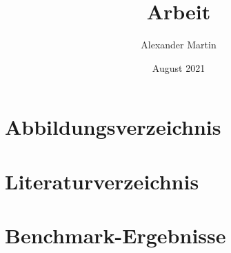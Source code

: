 \documentclass[11pt,titlepage]{book}
\title{Arbeit}
\author{Alexander Martin}
\date{August 2021}
\newcommand\blankpage{
    \null
    \thispagestyle{empty}
    \addtocounter{page}{-1}
    \newpage
}
\begin{document}
\let\origdoublepage\cleardoublepage
\newcommand{\clearemptydoublepage}{%
  \clearpage
  {\pagestyle{empty}\origdoublepage}%
}

\pagestyle{empty}

\afterpage{\blankpage}

\afterpage{\blankpage}

\let\cleardoublepage\clearemptydoublepage

\fancyhead{} %
\fancyhead[RO,LE]{\leftmark}
\setlength{\headheight}{15pt}
\pagestyle{fancy}
\tableofcontents








\chapter{Abbildungsverzeichnis}
\listoffigures

\chapter{Literaturverzeichnis}
\printbibliography

\appendix
\chapter{Benchmark-Ergebnisse}

\end{document}
